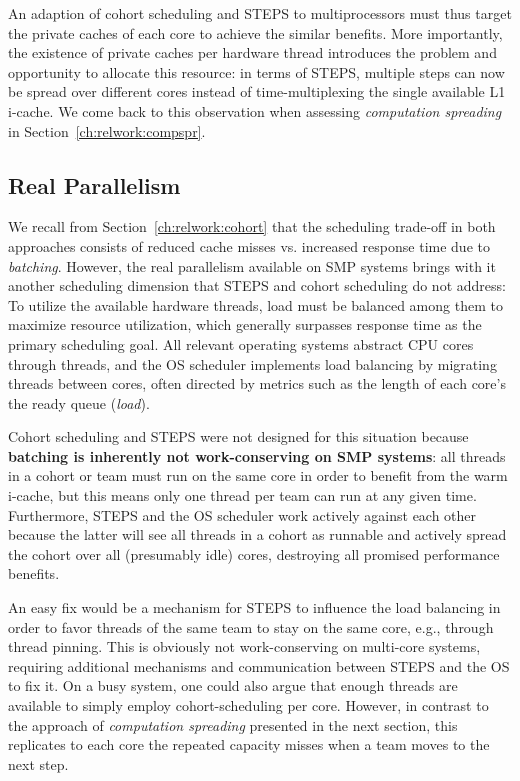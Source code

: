 \documentclass[12pt,a4paper]{book}
\begin{document}
An adaption of cohort scheduling and STEPS to multiprocessors must thus target the private caches of each core to achieve the similar benefits.
More importantly, the existence of private caches per hardware thread introduces the problem and opportunity to allocate this resource:
in terms of STEPS, multiple steps can now be spread over different cores instead of time-multiplexing the single available L1 i-cache.
We come back to this observation when assessing \emph{computation spreading} in Section~\ref{ch:relwork:compspr}.

\subsection{Real Parallelism}
We recall from Section~\ref{ch:relwork:cohort} that the scheduling trade-off in both approaches consists of reduced cache misses vs. increased response time due to \emph{batching}.
However, the real parallelism available on SMP systems brings with it another scheduling dimension that STEPS and cohort scheduling do not address:
To utilize the available hardware threads, load must be balanced among them to maximize resource utilization, which generally surpasses response time as the primary scheduling goal.
All relevant operating systems abstract CPU cores through threads, and the OS scheduler implements load balancing by migrating threads between cores, often directed by metrics such as the length of each core's the ready queue (\emph{load}).~\cite{freeBSDSchedulerLoad}

Cohort scheduling and STEPS were not designed for this situation because
\textbf{batching is inherently not work-conserving on SMP systems}:
all threads in a cohort or team must run on the same core in order to benefit from the warm i-cache, but this means only one thread per team can run at any given time.
Furthermore, STEPS and the OS scheduler work actively against each other because the latter will see all threads in a cohort as runnable and actively spread the cohort over all (presumably idle) cores,
destroying all promised performance benefits.

An easy fix would be a mechanism for STEPS to influence the load balancing in order to favor threads of the same team to stay on the same core, e.g., through thread pinning.
This is obviously not work-conserving on multi-core systems, requiring additional mechanisms and communication between STEPS and the OS to fix it.
On a busy system, one could also argue that enough threads are available to simply employ cohort-scheduling per core.
However, in contrast to the approach of \emph{computation spreading} presented in the next section, this replicates to each core the repeated capacity misses when a team moves to the next step.
\end{document}
